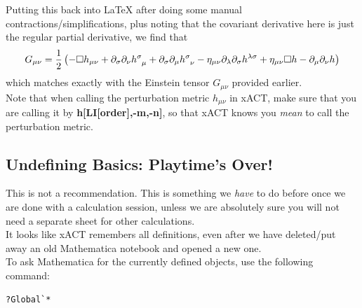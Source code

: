 \documentclass{book}
\theoremstyle{definition}
\newcommand{\p}{\partial}
\newcommand{\f}[2]{\frac{#1}{#2}}
\newcommand{\lp}{\left(}
\newcommand{\rp}{\right)}
\begin{document}
Putting this back into \LaTeX{} after doing some manual contractions/simplifications, plus noting that the covariant derivative here is just the regular partial derivative, we find that
\begin{align}\label{Gmunu}
G_{\mu\nu} = \f{1}{2}\lp -\square h_{\mu\nu} + \p_\sigma \p_\nu \tensor{h}{^\sigma_\mu}  
+ \p_\sigma \p_\mu \tensor{h}{^\sigma_\nu} 
- \eta_{\mu\nu}\p_\lambda \p_\sigma h^{\lambda\sigma} + \eta_{\mu\nu}\square h - \p_\mu\p_\nu h\rp
\end{align}
which matches exactly with the Einstein tensor $G_{\mu\nu}$ provided earlier.\\


Note that when calling the perturbation metric $h_{\mu\nu}$ in xACT, make sure that you are calling it by \textbf{h[LI[order],-m,-n]}, so that xACT knows you \textit{mean} to call the perturbation metric.


































\newpage



\subsection{Undefining Basics: Playtime's Over!}

This is not a recommendation. This is something we \textit{have} to do before once we are done with a calculation session, unless we are absolutely sure you will not need a separate sheet for other calculations. \\

It looks like xACT remembers all definitions, even after we have deleted/put away an old Mathematica notebook and opened a new one. \\

To ask Mathematica for the currently defined objects, use the following command:
\begin{lstlisting}
?Global`*
\end{lstlisting}
\end{document}
